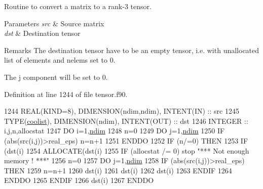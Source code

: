 Routine to convert a matrix to a rank-\/3 tensor. 


\begin{DoxyParams}{Parameters}
{\em src} & Source matrix \\
\hline
{\em dst} & Destination tensor \\
\hline
\end{DoxyParams}
\begin{DoxyRemark}{Remarks}
The destination tensor have to be an empty tensor, i.\+e. with unallocated list of elements and nelems set to 0. 

The j component will be set to 0. 
\end{DoxyRemark}


Definition at line 1244 of file tensor.\+f90.


\begin{DoxyCode}
1244    \textcolor{keywordtype}{REAL(KIND=8)}, \textcolor{keywordtype}{DIMENSION(ndim,ndim)}, \textcolor{keywordtype}{INTENT(IN)} :: src
1245    \textcolor{keywordtype}{TYPE}(\hyperlink{structtensor_1_1coolist}{coolist}), \textcolor{keywordtype}{DIMENSION(ndim)}, \textcolor{keywordtype}{INTENT(OUT)} :: dst
1246    \textcolor{keywordtype}{INTEGER} :: i,j,n,allocstat
1247    \textcolor{keywordflow}{DO} i=1,\hyperlink{namespaceparams_a2323fe1773f086e20c14f266351c482b}{ndim}
1248       n=0
1249       \textcolor{keywordflow}{DO} j=1,\hyperlink{namespaceparams_a2323fe1773f086e20c14f266351c482b}{ndim}
1250          \textcolor{keywordflow}{IF} (abs(src(i,j))>real\_eps) n=n+1
1251 \textcolor{keywordflow}{      ENDDO}
1252       \textcolor{keywordflow}{IF} (n/=0) \textcolor{keywordflow}{THEN}
1253          \textcolor{keywordflow}{IF} (dst(i)%
1254          \textcolor{keyword}{ALLOCATE}(dst(i)%
1255          \textcolor{keywordflow}{IF} (allocstat /= 0) stop \textcolor{stringliteral}{"*** Not enough memory ! ***"}
1256          n=0
1257          \textcolor{keywordflow}{DO} j=1,\hyperlink{namespaceparams_a2323fe1773f086e20c14f266351c482b}{ndim}
1258             \textcolor{keywordflow}{IF} (abs(src(i,j))>real\_eps) \textcolor{keywordflow}{THEN}
1259                n=n+1
1260                dst(i)%
1261                dst(i)%
1262                dst(i)%
1263 \textcolor{keywordflow}{            ENDIF}
1264 \textcolor{keywordflow}{         ENDDO}
1265 \textcolor{keywordflow}{      ENDIF}
1266       dst(i)%
1267 \textcolor{keywordflow}{   ENDDO}
\end{DoxyCode}
